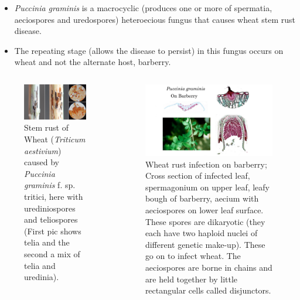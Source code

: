\documentclass[10pt,dvipsnames,ignorenonframetext,aspectratio=169]{beamer}
\providecommand{\tightlist}{%
  \setlength{\itemsep}{0pt}\setlength{\parskip}{0pt}}
\begin{document}
\begin{frame}{}
\protect\hypertarget{section-8}{}
\begin{itemize}
\tightlist
\item
  \emph{Puccinia graminis} is a macrocyclic (produces one or more of
  spermatia, aeciospores and uredospores) heteroecious fungus that
  causes wheat stem rust disease.
\item
  The repeating stage (allows the disease to persist) in this fungus
  occurs on wheat and not the alternate host, barberry.
\end{itemize}

\begin{columns}[T, onlytextwidth]

\begin{figure}
\includegraphics[width=0.8\linewidth]{../images/stem_rust_wheat_puccinia_graminis_f.sp.tritici} \caption{Stem rust of Wheat (\textit{Triticum aestivium}) caused by \textit{Puccinia graminis} f. sp. tritici, here with urediniospores and teliospores (First pic shows telia and the second a mix of telia and uredinia).}\label{fig:puccinia-graminis-wheat}
\end{figure}


\begin{figure}
\includegraphics[width=0.85\linewidth]{../images/berberry_aecium} \caption{Wheat rust infection on barberry; Cross section of infected leaf, spermagonium on upper leaf, leafy bough of barberry, aecium with aeciospores on lower leaf surface. These spores are dikaryotic (they each have two haploid nuclei of different genetic make-up). These go on to infect wheat. The aeciospores are borne in chains and are held together by little rectangular cells called disjunctors.}\label{fig:berberry-aecium}
\end{figure}

\end{columns}
\end{frame}
\end{document}
